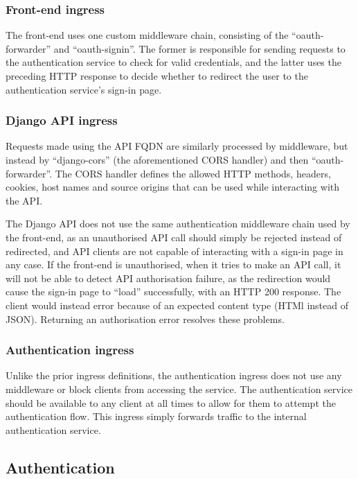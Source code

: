 \subsubsection{Front-end ingress}

The front-end uses one custom middleware chain, consisting of the ``oauth-forwarder'' and ``oauth-signin''. The former is responsible for sending requests to the authentication service to check for valid credentials, and the latter uses the preceding HTTP response to decide whether to redirect the user to the authentication service's sign-in page.

\subsubsection{Django API ingress}

Requests made using the API FQDN are similarly processed by middleware, but instead by ``django-cors'' (the aforementioned CORS handler) and then ``oauth-forwarder''. The CORS handler defines the allowed HTTP methods, headers, cookies, host names and source origins that can be used while interacting with the API.

The Django API does not use the same authentication middleware chain used by the front-end, as an unauthorised API call should simply be rejected instead of redirected, and API clients are not capable of interacting with a sign-in page in any case. If the front-end is unauthorised, when it tries to make an API call, it will not be able to detect API authorisation failure, as the redirection would cause the sign-in page to ``load'' successfully, with an HTTP 200 response. The client would instead error because of an expected content type (HTMl instead of JSON). Returning an authorisation error resolves these problems.

\subsubsection{Authentication ingress}

Unlike the prior ingress definitions, the authentication ingress does not use any middleware or block clients from accessing the service. The authentication service should be available to any client at all times to allow for them to attempt the authentication flow. This ingress simply forwards traffic to the internal authentication service.

\subsection{Authentication}

